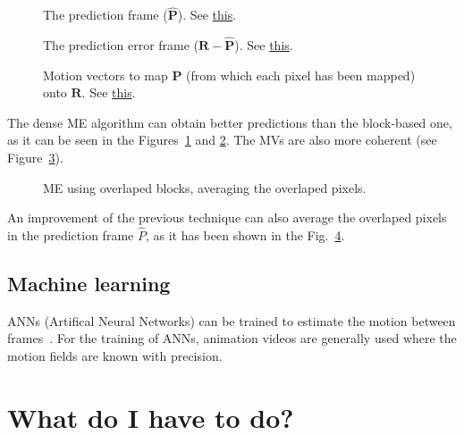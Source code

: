 \begin{figure}
  \centering
  \caption{The prediction frame (${\hat{\mathbf P}}$). See \href{https://github.com/Sistemas-Multimedia/Sistemas-Multimedia.github.io/blob/master/milestones/09-ME/full_search_dense_ME.ipynb}{this}.}
  \label{fig:hat_P_dense}
\end{figure}

\begin{figure}
  \centering
  \caption{The prediction error frame (${\mathbf R} - {\hat{\mathbf P}}$). See \href{https://github.com/Sistemas-Multimedia/Sistemas-Multimedia.github.io/blob/master/milestones/09-ME/full_search_dense_ME.ipynb}{this}.}
  \label{fig:error_dense}
\end{figure}

\begin{figure}
  \centering
  \caption{Motion vectors to map ${\mathbf P}$ (from which each pixel has been mapped) onto ${\mathbf R}$. See \href{https://github.com/Sistemas-Multimedia/Sistemas-Multimedia.github.io/blob/master/milestones/09-ME/full_search_dense_ME.ipynb}{this}.}
  \label{fig:MVs_dense}
\end{figure}

The dense ME algorithm can obtain better predictions than the
block-based one, as it can be seen in the
Figures~\ref{fig:hat_P_dense} and \ref{fig:error_dense}. The MVs are
also more coherent (see Figure~\ref{fig:MVs_dense}).

\begin{figure}
  \centering
  \caption{ME using overlaped blocks, averaging the overlaped pixels.}
  \label{fig:average}
\end{figure}

An improvement of the previous technique can also average the
overlaped pixels in the prediction frame $\hat{P}$, as it has been
shown in the Fig.~\ref{fig:average}.

\subsection{Machine learning}
ANNs (Artifical Neural Networks) can be trained to estimate the motion
between frames~\cite{dosovitskiy2015flownet}. For the training of
ANNs, animation videos are generally used where the motion fields are
known with precision.



\section{What do I have to do?}

